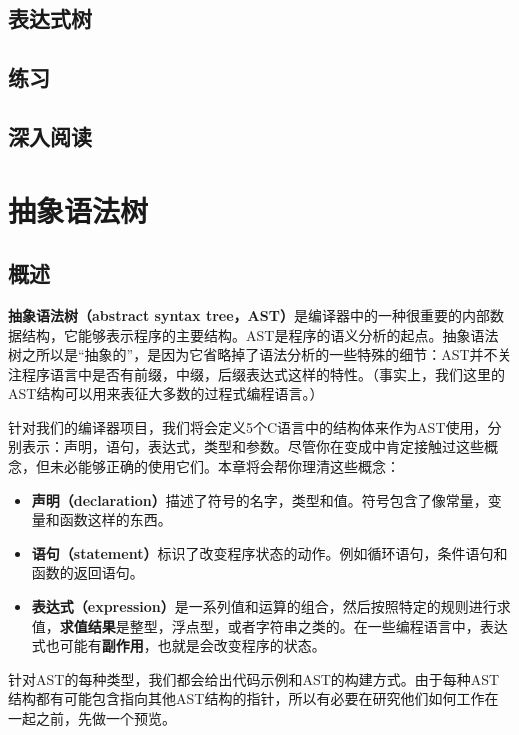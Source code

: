 \documentclass[cn,11pt,chinese]{elegantbook}
\begin{document}
\section{表达式树}

\section{练习}

\section{深入阅读}

\chapter{抽象语法树}

\section{概述}

\textbf{抽象语法树（abstract syntax tree，AST）}是编译器中的一种很重要的内部数据结构，它能够表示程序的主要结构。AST是程序的语义分析的起点。抽象语法树之所以是“抽象的”，是因为它省略掉了语法分析的一些特殊的细节：AST并不关注程序语言中是否有前缀，中缀，后缀表达式这样的特性。（事实上，我们这里的AST结构可以用来表征大多数的过程式编程语言。）

针对我们的编译器项目，我们将会定义5个C语言中的结构体来作为AST使用，分别表示：声明，语句，表达式，类型和参数。尽管你在变成中肯定接触过这些概念，但未必能够正确的使用它们。本章将会帮你理清这些概念：

\begin{itemize}
  \item \textbf{声明（declaration）}描述了符号的名字，类型和值。符号包含了像常量，变量和函数这样的东西。
  \item \textbf{语句（statement）}标识了改变程序状态的动作。例如循环语句，条件语句和函数的返回语句。
  \item \textbf{表达式（expression）}是一系列值和运算的组合，然后按照特定的规则进行求值，\textbf{求值结果}是整型，浮点型，或者字符串之类的。在一些编程语言中，表达式也可能有\textbf{副作用}，也就是会改变程序的状态。
\end{itemize}

针对AST的每种类型，我们都会给出代码示例和AST的构建方式。由于每种AST结构都有可能包含指向其他AST结构的指针，所以有必要在研究他们如何工作在一起之前，先做一个预览。
\end{document}
